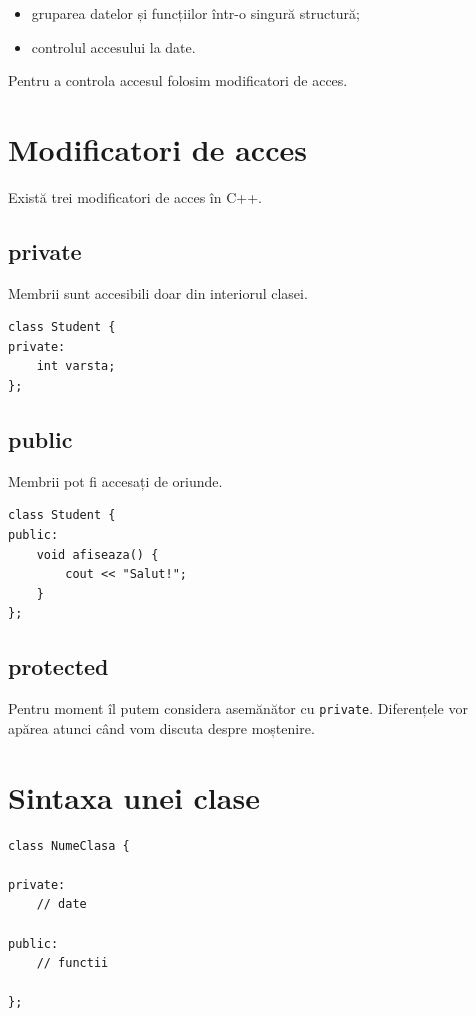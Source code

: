 \documentclass[12pt,a4paper]{article}
\begin{document}
\begin{itemize}
    \item gruparea datelor și funcțiilor într-o singură structură;
    \item controlul accesului la date.
\end{itemize}

Pentru a controla accesul folosim modificatori de acces.

\section{Modificatori de acces}

Există trei modificatori de acces în C++.

\subsection*{private}

Membrii sunt accesibili doar din interiorul clasei.

\begin{lstlisting}
class Student {
private:
    int varsta;
};
\end{lstlisting}

\subsection*{public}

Membrii pot fi accesați de oriunde.

\begin{lstlisting}
class Student {
public:
    void afiseaza() {
        cout << "Salut!";
    }
};
\end{lstlisting}

\subsection*{protected}

Pentru moment îl putem considera asemănător cu \texttt{private}. Diferențele vor apărea atunci când vom discuta despre moștenire.


\newpage
\section{Sintaxa unei clase}

\begin{lstlisting}
class NumeClasa {

private:
    // date

public:
    // functii

};
\end{lstlisting}
\end{document}

